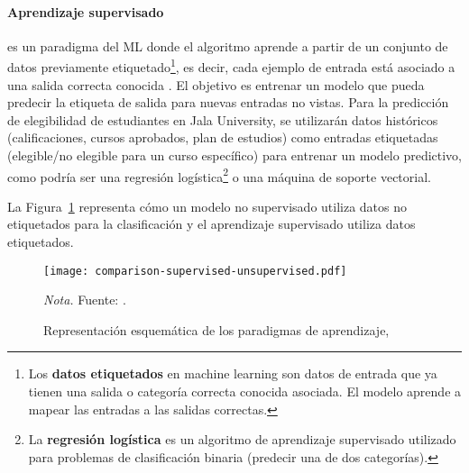 \paragraph{Aprendizaje supervisado}
es un paradigma del ML donde el algoritmo aprende a partir de un conjunto de datos previamente etiquetado\footnote{Los \textbf{datos etiquetados} en machine learning son datos de entrada que ya tienen una salida o categoría correcta conocida asociada.
El modelo aprende a mapear las entradas a las salidas correctas.}, es decir, cada ejemplo de entrada está asociado a una salida correcta conocida \parencite{Bishop2006}.
El objetivo es entrenar un modelo que pueda predecir la etiqueta de salida para nuevas entradas no vistas.
Para la predicción de elegibilidad de estudiantes en Jala University, se utilizarán datos históricos (calificaciones, cursos aprobados, plan de estudios) como entradas etiquetadas (elegible/no elegible para un curso específico) para entrenar un modelo predictivo, como podría ser una regresión logística\footnote{La \textbf{regresión logística} es un algoritmo de aprendizaje supervisado utilizado para problemas de clasificación binaria (predecir una de dos categorías).} o una máquina de soporte vectorial.

La Figura~\ref{fig:mlComparison} representa cómo un modelo no supervisado utiliza datos no etiquetados para la clasificación y el aprendizaje supervisado utiliza datos etiquetados.

\begin{figure}
    \centering
    \caption{Representación esquemática de los paradigmas de aprendizaje, } \label{fig:mlComparison}
    \texttt{[image: comparison-supervised-unsupervised.pdf]}

    \vspace{0.5em}
    \begin{minipage}{\textwidth}
        \small\textit{Nota.} Fuente: \textcite{morimoto2021}.
    \end{minipage}
\end{figure}






